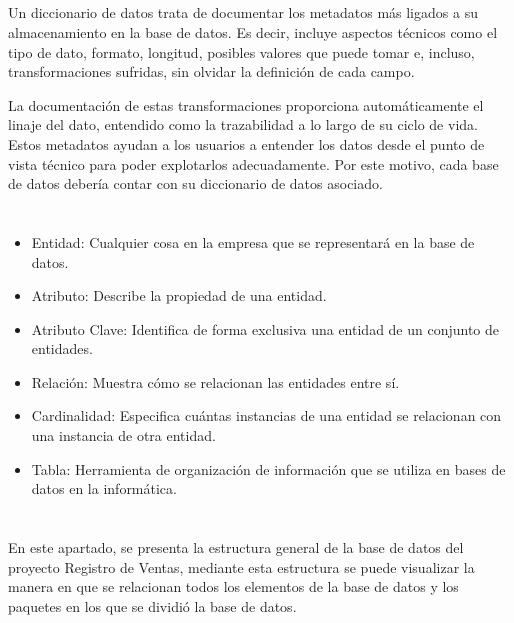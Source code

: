 \documentclass[10pt,a4paper]{article}
\begin{document}
\subsection{ \color{colorESCOM}{Diccionario de datos}}
Un diccionario de datos trata de documentar los metadatos más ligados a su almacenamiento en la base de datos. Es decir, incluye aspectos técnicos como el tipo de dato, formato, longitud, posibles valores que puede tomar e, incluso, transformaciones sufridas, sin olvidar la definición de cada campo. 

La documentación de estas transformaciones proporciona automáticamente el linaje del dato, entendido como la trazabilidad a lo largo de su ciclo de vida. Estos metadatos ayudan a los usuarios a entender los datos desde el punto de vista técnico para poder explotarlos adecuadamente. Por este motivo, cada base de datos debería contar con su diccionario de datos asociado. 
\pagebreak

\section{\color{colorIPN}{Conceptos}}

\begin{itemize}
	\item  Entidad: Cualquier cosa en la empresa que se representará en la base de datos.
	\item  Atributo: Describe la propiedad de una entidad.
	\item  Atributo Clave: Identifica de forma exclusiva una entidad de un conjunto de entidades.
	\item Relación: Muestra cómo se relacionan las entidades entre sí.
	\item Cardinalidad: Especifica cuántas instancias de una entidad se relacionan con una instancia de otra entidad.
	\item Tabla: Herramienta de organización de información que se utiliza en bases de datos en la informática.
	
\end{itemize}

\pagebreak

\section{\color{colorIPN}{Desarrollo}}
En este apartado, se presenta la estructura general de la base de datos del proyecto Registro de Ventas, mediante esta estructura se puede visualizar la manera en que se relacionan todos los elementos de la base de datos y los paquetes en los que se dividió la base de datos.
\end{document}
